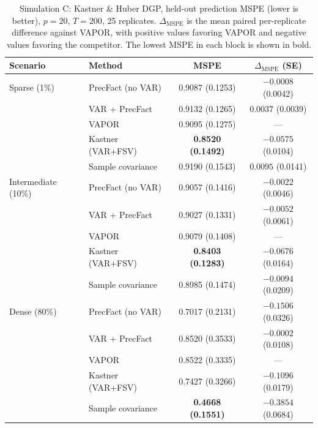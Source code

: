 \begin{table}[h!]
\centering
\small
\caption{Simulation C: Kastner \& Huber DGP, held-out prediction MSPE (lower is better), $p=20$, $T=200$, 25 replicates. $\Delta_{\mathrm{MSPE}}$ is the mean paired per-replicate difference against VAPOR, with positive values favoring VAPOR and negative values favoring the competitor. The lowest MSPE in each block is shown in bold.}
\label{tab:sim-c}
\begin{tabular}{llcc}
\toprule
Scenario & Method & MSPE & $\Delta_{\mathrm{MSPE}}$ (SE) \\
\midrule
Sparse (1\%)        & PrecFact (no VAR)   & 0.9087 (0.1253) & $-0.0008$ (0.0042) \\
                    & VAR + PrecFact      & 0.9132 (0.1265) & $0.0037$ (0.0039) \\
                    & VAPOR               & 0.9095 (0.1275) & --- \\
                    & Kastner (VAR+FSV)   & \textbf{0.8520 (0.1492)} & $-0.0575$ (0.0104) \\
                    & Sample covariance   & 0.9190 (0.1543) & $0.0095$ (0.0141) \\
\midrule
Intermediate (10\%) & PrecFact (no VAR)   & 0.9057 (0.1416) & $-0.0022$ (0.0046) \\
                    & VAR + PrecFact      & 0.9027 (0.1331) & $-0.0052$ (0.0061) \\
                    & VAPOR               & 0.9079 (0.1408) & --- \\
                    & Kastner (VAR+FSV)   & \textbf{0.8403 (0.1283)} & $-0.0676$ (0.0164) \\
                    & Sample covariance   & 0.8985 (0.1474) & $-0.0094$ (0.0209) \\
\midrule
Dense (80\%)        & PrecFact (no VAR)   & 0.7017 (0.2131) & $-0.1506$ (0.0326) \\
                    & VAR + PrecFact      & 0.8520 (0.3533) & $-0.0002$ (0.0108) \\
                    & VAPOR               & 0.8522 (0.3335) & --- \\
                    & Kastner (VAR+FSV)   & 0.7427 (0.3266) & $-0.1096$ (0.0179) \\
                    & Sample covariance   & \textbf{0.4668 (0.1551)} & $-0.3854$ (0.0684) \\
\bottomrule
\end{tabular}
\end{table}

